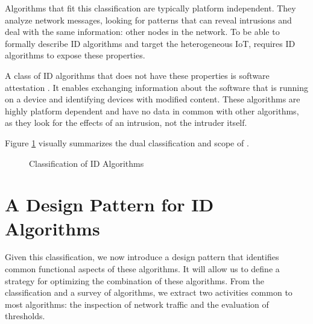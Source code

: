 \documentclass[conference]{IEEEtran}
\begin{document}
Algorithms that fit this classification are typically platform independent.
They analyze network messages, looking for patterns that can reveal intrusions
and deal with the same information: other nodes in the network. To be able to
formally describe ID algorithms and target the heterogeneous IoT, \NAME
requires ID algorithms to expose these properties.

A class of ID algorithms that does not have these properties is software
attestation \cite{seshadri2008sake}. It enables exchanging information about
the software that is running on a device and identifying devices with modified
content. These algorithms are highly platform dependent and have no data in
common with other algorithms, as they look for the effects of an intrusion, not
the intruder itself.

Figure \ref{fig:classification} visually summarizes the dual classification and
scope of \NAME.

\begin{figure}[ht]
  \centering
  \caption{Classification of ID Algorithms}
  \label{fig:classification}
\end{figure}

\section{A Design Pattern for ID Algorithms}
\label{pattern}

Given this classification, we now introduce a design pattern that identifies
common functional aspects of these algorithms. It will allow us to define a
strategy for optimizing the combination of these algorithms. From the
classification and a survey of algorithms, we extract two activities common to
most algorithms: the inspection of network traffic and the evaluation of
thresholds.
\end{document}
